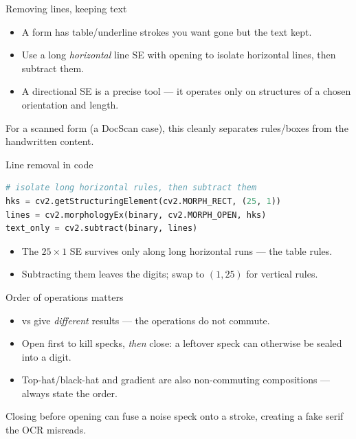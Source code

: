 \documentclass[10pt,aspectratio=169]{beamer}
\begin{document}
\begin{frame}{Removing lines, keeping text}
  \begin{itemize}
    \item A form has table/underline strokes you want gone but the text kept.
    \item Use a long \emph{horizontal} line SE with opening to isolate horizontal lines, then subtract them.
    \item A directional SE is a precise tool — it operates only on structures of a chosen orientation and length.
  \end{itemize}
  \begin{goodbox}
    For a scanned form (a DocScan case), this cleanly separates rules/boxes from the handwritten content.
  \end{goodbox}
\end{frame}

\begin{frame}[fragile]{Line removal in code}
\begin{lstlisting}[language=Python]
# isolate long horizontal rules, then subtract them
hks = cv2.getStructuringElement(cv2.MORPH_RECT, (25, 1))
lines = cv2.morphologyEx(binary, cv2.MORPH_OPEN, hks)
text_only = cv2.subtract(binary, lines)
\end{lstlisting}
  \begin{itemize}
    \item The $25\times1$ SE survives only along long horizontal runs — the table rules.
    \item Subtracting them leaves the digits; swap to $(1,25)$ for vertical rules.
  \end{itemize}
\end{frame}

\begin{frame}{Order of operations matters}
  \begin{itemize}
    \item {} vs  give \emph{different} results — the operations do not commute.
    \item Open first to kill specks, \emph{then} close: a leftover speck can otherwise be sealed into a digit.
    \item Top-hat/black-hat and gradient are also non-commuting compositions — always state the order.
  \end{itemize}
  \begin{badbox}
    Closing before opening can fuse a noise speck onto a stroke, creating a fake serif the OCR misreads.
  \end{badbox}
\end{frame}
\end{document}
